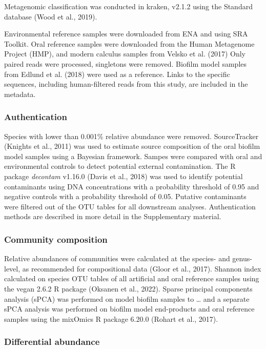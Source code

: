 \documentclass[
]{article}
\begin{document}
Metagenomic classification was conducted in kraken, v2.1.2 using the
Standard database (Wood et al., 2019).

Environmental reference samples were downloaded from ENA and using SRA
Toolkit. Oral reference samples were downloaded from the Human
Metagenome Project (HMP), and modern calculus samples from Velsko et al.
(2017) Only paired reads were processed, singletons were removed.
Biofilm model samples from Edlund et al. (2018) were used as a
reference. Links to the specific sequences, including human-filtered
reads from this study, are included in the metadata.

\hypertarget{authentication}{%
\subsubsection{Authentication}\label{authentication}}

Species with lower than 0.001\% relative abundance were removed.
SourceTracker (Knights et al., 2011) was used to estimate source
composition of the oral biofilm model samples using a Bayesian
framework. Sampes were compared with oral and environmental controls to
detect potential external contamination. The R package \emph{decontam}
v1.16.0 (Davis et al., 2018) was used to identify potential contaminants
using DNA concentrations with a probability threshold of 0.95 and
negative controls with a probability threshold of 0.05. Putative
contaminants were filtered out of the OTU tables for all downstream
analyses. Authentication methods are described in more detail in the
Supplementary material.

\hypertarget{community-composition}{%
\subsubsection{Community composition}\label{community-composition}}

Relative abundances of communities were calculated at the species- and
genus-level, as recommended for compositional data (Gloor et al., 2017).
Shannon index calculated on species OTU tables of all artificial and
oral reference samples using the vegan 2.6.2 R package (Oksanen et al.,
2022). Sparse principal components analysis (sPCA) was performed on
model biofilm samples to \ldots{} and a separate sPCA analysis was
performed on biofilm model end-products and oral reference samples using
the mixOmics R package 6.20.0 (Rohart et al., 2017).

\hypertarget{differential-abundance}{%
\subsubsection{Differential abundance}\label{differential-abundance}}
\end{document}
